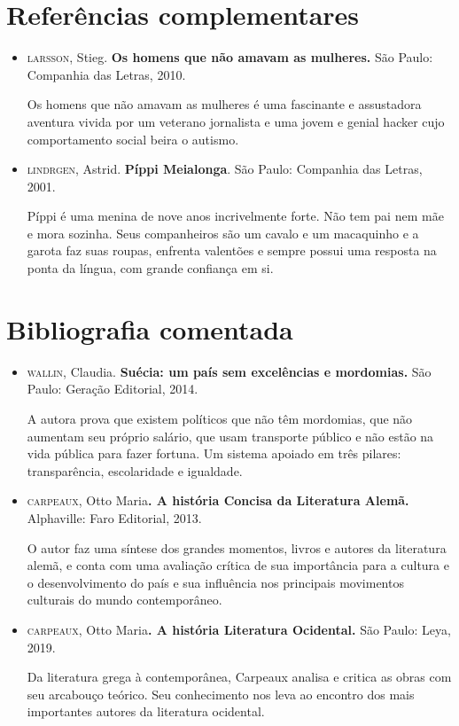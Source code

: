 \documentclass{extarticle}
\begin{document}
\section{Referências complementares}

\begin{itemize}
\item\textsc{larsson}, Stieg. \textbf{Os homens que não amavam as mulheres.} São
Paulo: Companhia das Letras, 2010.

Os homens que não amavam as mulheres é uma fascinante e assustadora
aventura vivida por um veterano jornalista e uma jovem e genial hacker
cujo comportamento social beira o autismo.

\item\textsc{lindrgen}, Astrid. \textbf{Píppi Meialonga}. São Paulo: Companhia das
Letras, 2001.

Píppi é uma menina de nove anos incrivelmente forte. Não tem pai nem mãe
e mora sozinha. Seus companheiros são um cavalo e um macaquinho e a
garota faz suas roupas, enfrenta valentões e sempre possui uma resposta
na ponta da língua, com grande confiança em si.
\end{itemize}

\section{Bibliografia comentada}

\begin{itemize}
\item\textsc{wallin}, Claudia. \textbf{Suécia: um país sem excelências e mordomias.}
São Paulo: Geração Editorial, 2014.

A autora prova que existem políticos que não têm mordomias, que não
aumentam seu próprio salário, que usam transporte público e não estão na
vida pública para fazer fortuna. Um sistema apoiado em três pilares:
transparência, escolaridade e igualdade.

\item\textsc{carpeaux}, Otto Maria\textbf{. A história Concisa da Literatura Alemã.}
Alphaville: Faro Editorial, 2013.

O autor faz uma síntese dos grandes momentos, livros e autores da
literatura alemã, e conta com uma avaliação crítica de sua importância
para a cultura e o desenvolvimento do país e sua influência nos
principais movimentos culturais do mundo contemporâneo.

\item\textsc{carpeaux}, Otto Maria\textbf{. A história Literatura Ocidental.} São
Paulo: Leya, 2019.

Da literatura grega à contemporânea, Carpeaux analisa e critica as obras
com seu arcabouço teórico. Seu conhecimento nos leva ao encontro dos
mais importantes autores da literatura ocidental.
\end{itemize}
\end{document}
